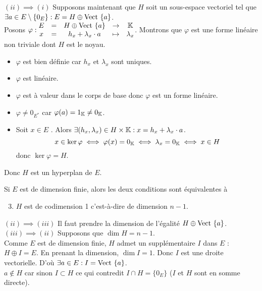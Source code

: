 \documentclass{article}
\begin{document}
\begin{question_kholle}
		$(ii) \implies (i)$ Supposons maintenant que $H$ soit un sous-espace vectoriel tel que $\exists a \in E \setminus \{0_E\} : E = H \oplus \text{Vect }{\{a\}}$. \\
		Posons $\displaystyle \varphi : \begin{matrix}
			E &=& H \oplus \text{Vect }{\{a\}} &\rightarrow& \mathbb K \\
			x &=& h_x + \lambda_x \cdot a &\mapsto& \lambda_x
		\end{matrix}$.
		Montrons que $\varphi$ est une forme linéaire non triviale dont $H$ est le noyau.
		\begin{itemize}
			\item $\varphi$ est bien définie car $h_x$ et $\lambda_x$ sont uniques.
			\item $\varphi$ est linéaire.
			\item $\varphi$ est à valeur dans le corps de base \K donc $\varphi$ est un forme linéaire.
			\item $\varphi \neq 0_{E^*}$ car $\varphi(a) = 1_{\mathbb K} \neq 0_{\mathbb K}$.
			\item Soit $x \in E$ \fq. Alors $\exists (h_x, \lambda_x) \in H \times \mathbb K : x = h_x + \lambda_x \cdot a$.
			\begin{equation*}
				x \in \ker \varphi
				\iff \varphi(x) = 0_{\mathbb K}
				\iff \lambda_x = 0_{\mathbb K}
				\iff x \in H
			\end{equation*}
			donc $\ker \varphi = H$.
		\end{itemize}
		Donc $H$ est un hyperplan de $E$.
		\bigbreak
		
		Si $E$ est de dimension finie, alors les deux conditions sont équivalentes à
		\begin{enumerate}[label=$(\roman*)$, leftmargin=1.5cm]
			\setcounter{enumi}{2}
			\item $H$ est de codimension 1 c'est-à-dire de dimension $n - 1$.
		\end{enumerate}
		$(ii) \implies (iii)$ Il faut prendre la dimension de l'égalité $H \oplus \text{Vect }{\{a\}}$. \\
		$(iii) \implies (ii)$ Supposons que $\dim H = n - 1$. \\
		Comme $E$ est de dimension finie, $H$ admet un supplémentaire $I$ dans $E$ : $H \oplus I = E$.
		En prenant la dimension, $\dim I = 1$. Donc $I$ est une droite vectorielle.
		D'où $\exists a \in E : I = \text{Vect }{\{a\}}$. \\
		$a \notin H$ car sinon $I \subset H$ ce qui contredit $I \cap H = \{0_E\}$ ($I$ et $H$ sont en somme directe).
	\end{question_kholle}
	
\end{document}
